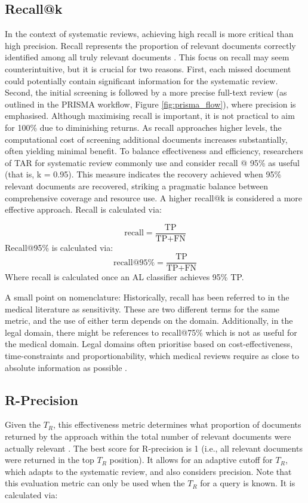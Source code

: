 \documentclass[10pt,oneside]{book}
\begin{document}
\subsection{Recall@k}
In the context of systematic reviews, achieving high recall is more critical than high precision. Recall represents the proportion of relevant documents correctly identified among all truly relevant documents \cite{omara-eves_using_2015}. This focus on recall may seem counterintuitive, but it is crucial for two reasons. First, each missed document could potentially contain significant information for the systematic review. Second, the initial screening is followed by a more precise full-text review (as outlined in the PRISMA workflow, Figure \ref{fig:prisma_flow}), where precision is emphasised.
Although maximising recall is important, it is not practical to aim for 100\% due to diminishing returns. As recall approaches higher levels, the computational cost of screening additional documents increases substantially, often yielding minimal benefit. To balance effectiveness and efficiency, researchers of TAR for systematic review commonly use and consider recall @ 95\% as useful (that is, k = 0.95). This measure indicates the recovery achieved when 95\% relevant documents are recovered, striking a pragmatic balance between comprehensive coverage and resource use. A higher recall@k is considered a more effective approach.
Recall is calculated via:

\begin{equation}
\text{recall} = \frac{\text{TP}}{\text{TP} + \text{FN}}
\end{equation}
Recall@95\% is calculated via:
\begin{equation}
\text{recall@95\%} = \frac{\text{TP}}{\text{TP} + \text{FN}}
\end{equation}
Where recall is calculated once an AL classifier achieves 95\% TP.

A small point on nomenclature: Historically, recall has been referred to in the medical literature as sensitivity. These are two different terms for the same metric, and the use of either term depends on the domain. Additionally, in the legal domain, there might be references to recall@75\% which is not as useful for the medical domain. Legal domains often prioritise based on cost-effectiveness, time-constraints and proportionability, which medical reviews require as close to absolute information as possible \cite{tsafnat_systematic_2014}.

\subsection{R-Precision}
Given the \textbf{$T_R$}, this effectiveness metric determines what proportion of documents returned by the approach within the total number of relevant documents were actually relevant \cite{manning_introduction_2008}. The best score for R-precision is 1 (i.e., all relevant documents were returned in the top \textbf{$T_R$} position). It allows for an adaptive cutoff for \textbf{$T_R$}, which adapts to the systematic review, and also considers precision. Note that this evaluation metric can only be used when the \textbf{$T_R$} for a query is known. It is calculated via:
\end{document}

